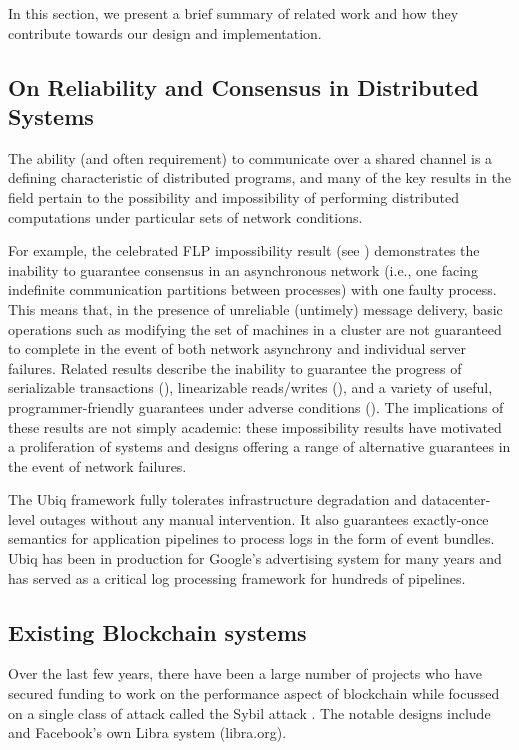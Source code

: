 \label{sec:related}
In this section, we present a brief summary of related work and how they contribute towards
our design and implementation.


\subsection{On Reliability and Consensus in Distributed Systems}

The ability (and often requirement) to communicate over a shared channel is a defining characteristic of distributed
programs, and many of the key results in the field pertain to the possibility and impossibility of performing
distributed computations under particular sets of network conditions.

For example, the celebrated FLP impossibility result (see \cite{fischer1985}) demonstrates the inability to guarantee consensus in an
asynchronous network (i.e., one facing indefinite communication partitions between processes) with one faulty process.
This means that, in the presence of unreliable (untimely) message delivery, basic operations such as modifying the set
of machines in a cluster are
not guaranteed to complete in the event of both network asynchrony and individual server failures. Related results
describe the inability to guarantee the progress of serializable transactions (\cite{Davidson1985}), linearizable
reads/writes (\cite{Gilbert2002}), and a variety of useful, programmer-friendly guarantees under adverse conditions
 (\cite{Bailis2013}). The implications of these results are not simply academic: these impossibility results have motivated
a proliferation of systems and designs offering a range of alternative guarantees in the event of network failures.

The Ubiq \cite{ubiq}framework fully tolerates infrastructure degradation and datacenter-level outages without any manual
intervention. It also guarantees exactly-once semantics for application pipelines to process logs in the form of event
bundles. Ubiq has been in production for Google’s advertising system for many years and has served as a critical log
processing framework for hundreds of pipelines. 

\subsection{Existing Blockchain systems} Over the last few years, there have been a large number of projects who have
secured funding to work on the performance aspect of blockchain while focussed on a single class of attack called the
Sybil attack \cite{john2002}. The notable designs include \cite{rapidchain, chainspace, ava2018, thundertoken} and
Facebook's own Libra system (libra.org).

